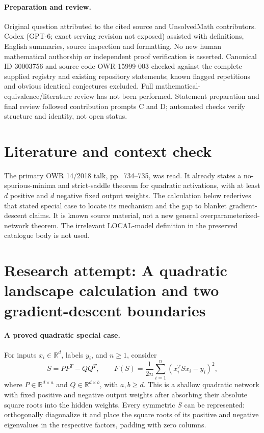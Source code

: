 \documentclass[11pt]{article}
\begin{document}
\paragraph{Preparation and review.}
Original question attributed to the cited source and UnsolvedMath contributors. Codex (GPT-6; exact serving revision not exposed) assisted with definitions, English summaries, source inspection and formatting. No new human mathematical authorship or independent proof verification is asserted. Canonical ID 30003756 and source code OWR-15999-003 checked against the complete supplied registry and existing repository statements; known flagged repetitions and obvious identical conjectures excluded. Full mathematical-equivalence/literature review has not been performed. Statement preparation and final review followed contribution prompts C and D; automated checks verify structure and identity, not open status.
\label{end:30003756}

\section{Literature and context check}
The primary OWR 14/2018 talk, pp.~734--735, was read. It already states a no-spurious-minima and strict-saddle theorem for quadratic activations, with at least $d$ positive and $d$ negative fixed output weights. The calculation below rederives that stated special case to locate its mechanism and the gap to blanket gradient-descent claims. It is known source material, not a new general overparameterized-network theorem. The irrelevant LOCAL-model definition in the preserved catalogue body is not used.
\section{Research attempt: A quadratic landscape calculation and two gradient-descent boundaries}

\paragraph{A proved quadratic special case.}
For inputs $x_i\in\mathbb R^d$, labels $y_i$, and $n\ge1$, consider
\[
 S=PP^T-QQ^T,\qquad
 F(S)=\frac1{2n}\sum_{i=1}^n(x_i^TSx_i-y_i)^2,
\]
where $P\in\mathbb R^{d\times a}$ and $Q\in\mathbb R^{d\times b}$, with $a,b\ge d$. This is a shallow quadratic network with fixed positive and negative output weights after absorbing their absolute square roots into the hidden weights. Every symmetric $S$ can be represented: orthogonally diagonalize it and place the square roots of its positive and negative eigenvalues in the respective factors, padding with zero columns.
\end{document}
